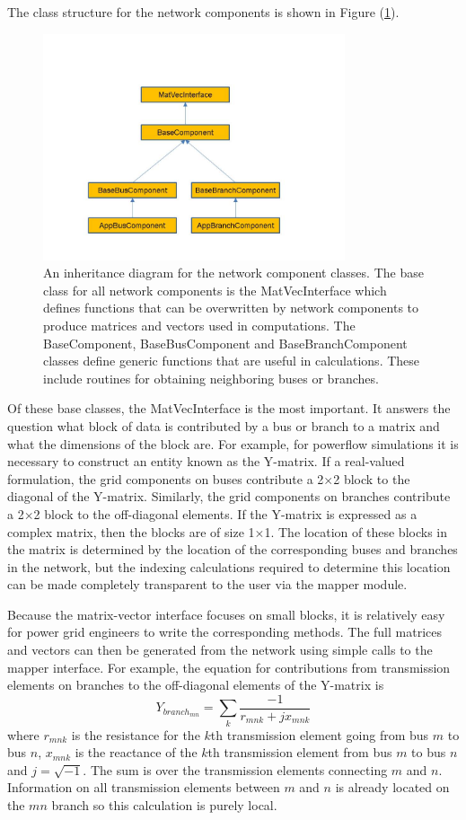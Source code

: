 \documentclass{acm_proc_article-sp}
\begin{document}
The class structure for the network components is shown in Figure
(\ref{classes}). 
\begin{figure}
\centering
\includegraphics[width=3.5in,keepaspectratio=true]{./FigNC}
\caption{\label{classes} An inheritance diagram for the network component
classes. The base class for all network components is the MatVecInterface which
defines functions that can be overwritten by network components to produce
matrices and vectors used in computations. The BaseComponent, BaseBusComponent
and BaseBranchComponent classes define generic functions that are useful in
calculations. These include routines for obtaining neighboring buses or
branches.}
\end{figure}
Of these base classes, the MatVecInterface is the most important. It answers the
question what block of data is contributed by a bus or branch to a matrix and what
the dimensions of the block are. For example, for powerflow simulations it is
necessary to construct an entity known as the Y-matrix.  If a real-valued formulation,
the grid components on buses contribute a 2$\times$2 block to the
diagonal of the Y-matrix. Similarly, the grid components on branches contribute a 2$\times$2
block to the off-diagonal elements. If the Y-matrix is expressed as a complex
matrix, then the blocks are of size 1$\times$1. The location of these blocks in the
matrix is determined by the location of the corresponding buses and branches in the
network, but the indexing calculations required to determine this location can be made
completely transparent to the user via the mapper module. 

Because the matrix-vector interface focuses on small blocks, it is relatively easy
for power grid engineers to write the corresponding methods. The full matrices and vectors
can then be generated from the network using simple calls to the mapper interface.
For example, the equation for contributions from transmission elements on
branches to the off-diagonal elements of the Y-matrix is\cite{PF}
\begin{equation}
\label{ydiag}
Y_{branch_{mn}} = \sum_{k}\frac{-1}{r_{mnk}+jx_{mnk}}
\end{equation}
where $r_{mnk}$ is the resistance for the $k$th transmission element going from
bus $m$ to bus $n$, $x_{mnk}$ is the reactance of the $k$th transmission element
from bus $m$ to bus $n$ and $j=\sqrt{-1}$.  The sum is over the transmission
elements connecting $m$ and $n$. Information on all transmission
elements between $m$ and $n$ is already located on the $mn$ branch so this
calculation is purely local.
\end{document}
